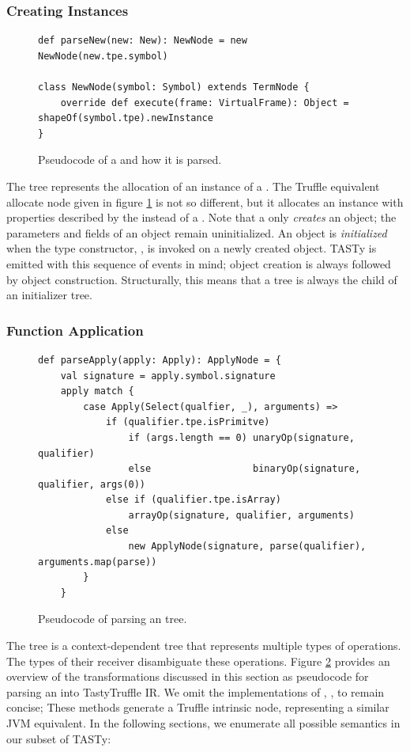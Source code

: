 \subsubsection*{Creating Instances}

\begin{figure}[!htb]
\begin{verbatim}
def parseNew(new: New): NewNode = new NewNode(new.tpe.symbol)	

class NewNode(symbol: Symbol) extends TermNode {
	override def execute(frame: VirtualFrame): Object =  shapeOf(symbol.tpe).newInstance
}
\end{verbatim}
\caption{Pseudocode of a  and how it is parsed.}
\label{impl:new-node}
\end{figure}

The  tree represents the allocation of an instance of a .
The Truffle equivalent allocate node given in figure \ref{impl:new-node} is not so different, but it allocates an instance with properties described by the  instead of a .
Note that a  only \textit{creates} an object; the parameters and fields of an object remain uninitialized.
An object is \textit{initialized} when the type constructor, , is invoked on a newly created object.
TASTy is emitted with this sequence of events in mind; object creation is always followed by object construction.
Structurally, this means that a  tree is always the child of an initializer  tree.

\subsubsection*{Function Application}
\label{impl:subsection:apply}

\begin{figure}[!htb]
\begin{verbatim}
def parseApply(apply: Apply): ApplyNode = {
	val signature = apply.symbol.signature
	apply match {
		case Apply(Select(qualfier, _), arguments) => 
			if (qualifier.tpe.isPrimitve)
				if (args.length == 0) unaryOp(signature, qualifier)
				else                  binaryOp(signature, qualifier, args(0))
			else if (qualifier.tpe.isArray)
				arrayOp(signature, qualifier, arguments)
			else 
				new ApplyNode(signature, parse(qualifier), arguments.map(parse))	
		}
	}
\end{verbatim}
\caption{Pseudocode of parsing an  tree.}
\label{impl:parse-apply}
\end{figure}
The  tree is a context-dependent tree that represents multiple types of operations.
The types of their receiver disambiguate these operations.
Figure \ref{impl:parse-apply} provides an overview of the transformations discussed in this section as pseudocode for parsing an  into TastyTruffle IR.
We omit the implementations of , ,  to remain concise; 
These methods generate a Truffle intrinsic node, representing a similar JVM equivalent.
In the following sections, we enumerate all possible semantics in our subset of TASTy:

